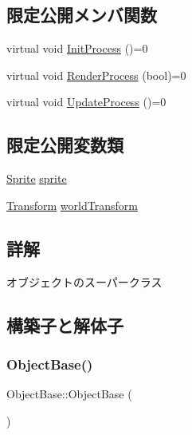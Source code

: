 \subsection*{限定公開メンバ関数}
\begin{DoxyCompactItemize}
\item 
virtual void \mbox{\hyperlink{class_object_base_af133f36f2bca1dcfd962e2cfac61ab51}{Init\+Process}} ()=0
\item 
virtual void \mbox{\hyperlink{class_object_base_aeac51d868beeb7f7fe900407b76b93a2}{Render\+Process}} (bool)=0
\item 
virtual void \mbox{\hyperlink{class_object_base_a8b5b72b363a419767efde0b0e692ea95}{Update\+Process}} ()=0
\end{DoxyCompactItemize}
\subsection*{限定公開変数類}
\begin{DoxyCompactItemize}
\item 
\mbox{\hyperlink{class_sprite}{Sprite}} \mbox{\hyperlink{class_object_base_a16415e349623e10f45518fb637f7051b}{sprite}}
\item 
\mbox{\hyperlink{class_transform}{Transform}} \mbox{\hyperlink{class_object_base_abedc2ea4baa694611f8822ea6e04b210}{world\+Transform}}
\end{DoxyCompactItemize}


\subsection{詳解}
オブジェクトのスーパークラス 

\subsection{構築子と解体子}
\mbox{\label{class_object_base_af2c3a18da2d1cd1c0dd5fae168207f0c}} 
\subsubsection{\texorpdfstring{Object\+Base()}{ObjectBase()}}
{\footnotesize\ttfamily Object\+Base\+::\+Object\+Base (\begin{DoxyParamCaption}{ }\end{DoxyParamCaption})\hspace{0.3cm}{\ttfamily [inline]}}



